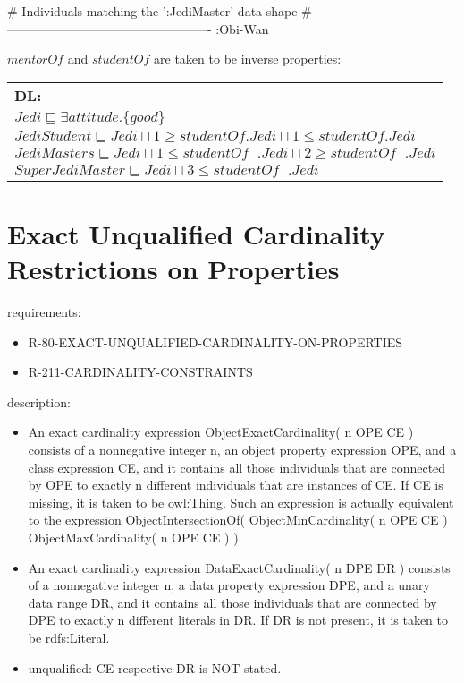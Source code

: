 \documentclass{llncs}
\newenvironment{DL}{
  \scriptsize
  \sffamily
  \vspace{0.3cm}
  \begin{tabular}{l}
	\textbf{DL:} \\

}{
  \end{tabular}
  \linebreak
}
\newcommand{\tb}[1]{\todo[size=\small, color=blue!40]{\textbf{Thomas:} #1}}
\begin{document}
\begin{ex}
# Individuals matching the ’:JediMaster’ data shape
# -------------------------------------------------
:Obi-Wan
\end{ex}


\noindent $mentorOf$ and $studentOf$ are taken to be inverse properties:\\

\begin{DL}
$Jedi \sqsubseteq \exists attitude.\{good\} $\\
$JediStudent \sqsubseteq Jedi \sqcap 1\geq studentOf.Jedi \sqcap 1\leq studentOf.Jedi$ \\
$JediMasters \sqsubseteq Jedi \sqcap 1\leq studentOf^{-}.Jedi\sqcap 2\geq studentOf^{-}.Jedi $\\
$SuperJediMaster \sqsubseteq Jedi \sqcap  3\leq studentOf^{-}.Jedi $
\end{DL}

\section{Exact Unqualified Cardinality Restrictions on Properties}

requirements:

\begin{itemize}
	\item R-80-EXACT-UNQUALIFIED-CARDINALITY-ON-PROPERTIES
	\item R-211-CARDINALITY-CONSTRAINTS
\end{itemize}

description:

\begin{itemize}
	\item An exact cardinality expression ObjectExactCardinality( n OPE CE ) consists of a nonnegative integer n, an object property expression OPE, and a class expression CE, and it contains all those individuals that are connected by OPE to exactly n different individuals that are instances of CE. If CE is missing, it is taken to be owl:Thing. Such an expression is actually equivalent to the expression ObjectIntersectionOf( ObjectMinCardinality( n OPE CE ) ObjectMaxCardinality( n OPE CE ) ).
	\item An exact cardinality expression DataExactCardinality( n DPE DR ) consists of a nonnegative integer n, a data property expression DPE, and a unary data range DR, and it contains all those individuals that are connected by DPE to exactly n different literals in DR. If DR is not present, it is taken to be rdfs:Literal. 
	\item unqualified: CE respective DR is NOT stated. 
\end{itemize}
\end{document}
